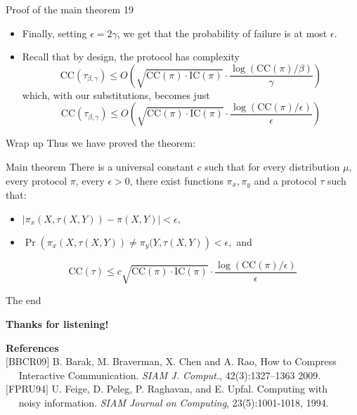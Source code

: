 \documentclass[10pt]{beamer}
\newcommand\CC{\textrm{CC}}
\newcommand\IC{\textrm{IC}}
\begin{document}
\begin{frame}{Proof of the main theorem 19}
\begin{itemize}
    \item Finally, setting $\epsilon = 2\gamma$, we get that the probability of failure is at most $\epsilon.$
    \pause
    \item Recall that by design, the protocol has complexity
    $$ \CC(\tau_{\beta, \gamma}) \leq O \left( \sqrt{\CC(\pi) \cdot \IC(\pi)} \cdot  \frac{\log(\CC(\pi)/\beta)}{\gamma} \right)$$
    which, with our substitutions, becomes just
    $$ \CC(\tau_{\beta, \gamma}) \leq O \left( \sqrt{\CC(\pi) \cdot \IC(\pi)} \cdot  \frac{\log(\CC(\pi)/\epsilon)}{\epsilon} \right)$$
\end{itemize}
\end{frame}

\begin{frame}{Wrap up}
Thus we have proved the theorem:

\begin{alertblock}{Main theorem}
	There is a universal constant $c$ such that for every distribution $\mu$, every protocol $\pi$, every $\epsilon > 0$, there exist functions $\pi_x, \pi_y$ and a protocol $\tau$ such that:
	\begin{itemize}
	    \item $|\pi_x(X, \tau(X, Y)) - \pi(X, Y)| < \epsilon,$
	    \vskip 0.4cm
	    \item $\Pr \left( \pi_x(X, \tau(X, Y)) \neq \pi_y(Y, \tau(X, Y) \right) < \epsilon,$ and 
	    \vskip 0.6cm
	\end{itemize}
	$$ \CC(\tau) \leq c \sqrt{\CC(\pi) \cdot \IC(\pi)} \cdot \frac{\log(\CC(\pi)/\epsilon)}{\epsilon} $$
\end{alertblock}
\end{frame}

\begin{frame}{The end}
\begin{center}
    \textbf{\huge Thanks for listening!}
    \vskip 1cm
\end{center}
{
    \small
    \textbf{References}
    \vskip 0.2cm
    \\ $[$BBCR09$]$ B. Barak, M. Braverman, X. Chen and A. Rao, How to Compress
    \\ $\quad$ Interactive Communication. \textit{SIAM J. Comput.}, 42(3):1327–1363 2009.
    \vskip 0.2cm
    \\ $[$FPRU94$]$ U. Feige, D. Peleg, P. Raghavan, and E. Upfal. Computing with
    \\ $\quad$ noisy information. \textit{SIAM Journal on Computing}, 23(5):1001-1018, 1994.
}
\end{frame}
\end{document}
